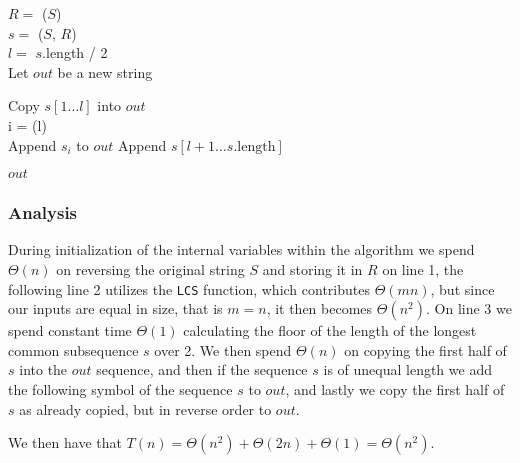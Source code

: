 \documentclass[11pt,english]{article}
\begin{document}
\begin{algorithm}
	
	\BlankLine
	
	$R =$ \Reverse($S$)\\
	$s =$ \LCS($S$, $R$)\\
	$l =$ $s$.length / 2\\
	Let $out$ be a new string
	
	Copy $s[1 \dots l]$ into $out$\\
	{
		i = \Ceil(l)\\
		Append $s_i$ to $out$
	}
	Append $s[l+1 \dots s\text{.length}]$
	
	\Return $out$	
\end{algorithm}

\subsubsection*{Analysis}
During initialization of the internal variables within the algorithm we spend
$\Theta(n)$ on reversing the original string $S$ and storing it in $R$ on line
1, the following line 2 utilizes the \texttt{LCS} function, which contributes
$\Theta(mn)$, but since our inputs are equal in size, that is $m = n$, it then
becomes $\Theta(n^2)$. On line 3 we spend constant time $\Theta(1)$
calculating the floor of the length of the longest common subsequence $s$ over
2. We then spend $\Theta(n)$ on copying the first half of $s$ into the $out$
sequence, and then if the sequence $s$ is of unequal length we add the
following symbol of the sequence $s$ to $out$, and lastly we copy the first
half of $s$ as already copied, but in reverse order to $out$.

We then have that $T(n) = \Theta(n^2) + \Theta(2n) + \Theta(1) = \Theta(n^2)$.
\end{document}
